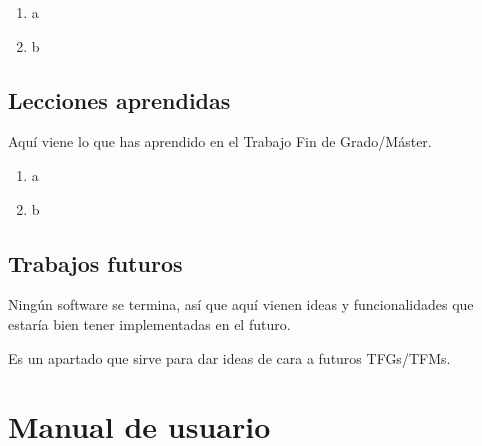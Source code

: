\documentclass[a4paper, 12pt, english]{book}
\begin{document}
\begin{enumerate}
  \item a
  \item b
\end{enumerate}


\section{Lecciones aprendidas}
\label{sec:lecciones_aprendidas}

Aquí viene lo que has aprendido en el Trabajo Fin de Grado/Máster.

\begin{enumerate}
  \item a
  \item b
\end{enumerate}


\section{Trabajos futuros}
\label{sec:trabajos_futuros}

Ningún software se termina, así que aquí vienen ideas y funcionalidades que estaría bien tener implementadas en el futuro.

Es un apartado que sirve para dar ideas de cara a futuros TFGs/TFMs.



\cleardoublepage
\appendix
\chapter{Manual de usuario}
\label{app:manual}



\cleardoublepage


\end{document}
